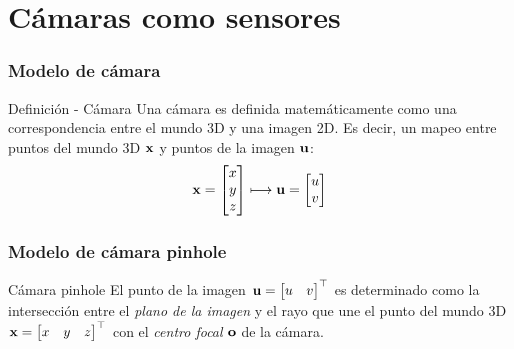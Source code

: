 \section{Cámaras como sensores}


\begin{frame}
\frametitle{Modelo de cámara}

\begin{block}{Definición - Cámara}
Una cámara es definida matemáticamente como una correspondencia entre el mundo 3D y una imagen 2D. Es decir, un mapeo entre puntos del mundo 3D $\boldsymbol{\mathbf{x}}$ y puntos de la imagen $\boldsymbol{\mathbf{u}}$:
\begin{equation}
\boldsymbol{\mathbf{x}}=\begin{bmatrix}x\\
y\\
z
\end{bmatrix}\longmapsto
\boldsymbol{\mathbf{u}}=\begin{bmatrix}u\\
v
\end{bmatrix}
\end{equation}
\end{block}

\end{frame}


\begin{frame}
\frametitle{Modelo de cámara pinhole}



\begin{block}{Cámara pinhole}
El punto de la imagen $\boldsymbol{\mathbf{u}}=\begin{bmatrix}u & v\end{bmatrix}^{\top}$ es determinado como la intersección entre el \emph{plano de la imagen} y el rayo que une el punto del mundo 3D $\boldsymbol{\mathbf{x}}=\begin{bmatrix}x & y & z\end{bmatrix}^{\top}$ con el \emph{centro focal} $\boldsymbol{\mathbf{o}}$ de la cámara.
\end{block}

\begin{figure}[!htb]
	\centering
	\hfill
\end{figure}

\end{frame}


